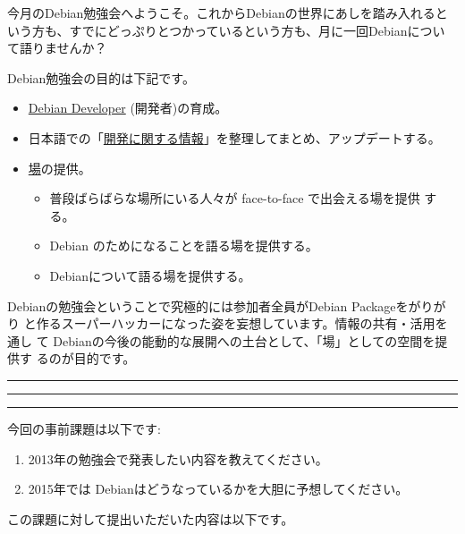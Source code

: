 \documentclass[mingoth,a4paper]{jsarticle}
\begin{document}
\begin{multicols}{2}
 

 今月のDebian勉強会へようこそ。これからDebianの世界にあしを踏み入れると
 いう方も、すでにどっぷりとつかっているという方も、月に一回Debianについ
 て語りませんか？

 Debian勉強会の目的は下記です。

 \begin{itemize}
 \item \underline{Debian Developer} (開発者)の育成。
 \item 日本語での「\underline{開発に関する情報}」を整理してまとめ、アップデートする。
 \item \underline{場}の提供。
 \begin{itemize}
  \item 普段ばらばらな場所にいる人々が face-to-face で出会える場を提供
	する。
  \item Debian のためになることを語る場を提供する。
  \item Debianについて語る場を提供する。
 \end{itemize}
 \end{itemize}		

 Debianの勉強会ということで究極的には参加者全員がDebian Packageをがりがり
 と作るスーパーハッカーになった姿を妄想しています。情報の共有・活用を通し
 て Debianの今後の能動的な展開への土台として、「場」としての空間を提供す
 るのが目的です。

\end{multicols}

\newpage

\begin{minipage}[b]{0.2\hsize}
 \colorbox{titleback}{}
\end{minipage}
\begin{minipage}[b]{0.8\hsize}
\hrule
\vspace{2mm}
\hrule
\begin{multicols}{2}
\tableofcontents
\end{multicols}
\vspace{2mm}
\hrule
\end{minipage}


今回の事前課題は以下です:
\begin{enumerate}
 \item 2013年の勉強会で発表したい内容を教えてください。
 \item 2015年では Debianはどうなっているかを大胆に予想してください。
\end{enumerate}
この課題に対して提出いただいた内容は以下です。
\begin{multicols}{2}
{\small
 
}
\end{multicols}
\end{document}
